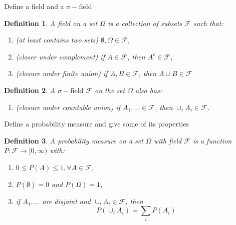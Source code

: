 \documentclass[avery5388,grid,frame]{flashcards}
\newcommand{\sigf}{\sigma-\text{field}}
\newcommand{\F}{\mathcal F}
\newtheorem*{definition}{Definition}
\begin{document}


\begin{flashcard}
    {Define a field and a $\sigf$}
    \begin{definition}
        A field on a set $\Omega$ is a collection of subsets $\F$ such that:
        \begin{enumerate}
            \item (at least contains two sets) $\emptyset, \Omega \in \F$,
            \item (closer under complement) if $A \in \F$, then $A^c \in \F$,
            \item (closure under finite union) if $A, B \in \F$, then $A \cup B \in \F$
        \end{enumerate}
    \end{definition}

    \begin{definition}
        A $\sigf$ $\F$ on the set $\Omega$ also has:
        \begin{enumerate}[resume]
            \item (closure under countable union) if $A_1, \dots \in \F$, then $\cup_i A_i \in \F$.
        \end{enumerate}
    \end{definition}
\end{flashcard}


\begin{flashcard}
    {Define a probability measure and give some of its properties}
    \begin{definition}
        A probability measure on a set $\Omega$ with field $\F$ is a function $P: \F \rightarrow [0, \infty)$ with:
        \begin{enumerate}
            \item $0 \leq P(A) \leq 1, \forall A \in \F$,
            \item $P(\emptyset) = 0$ and $P(\Omega) = 1$,
            \item if $A_1, \dots$ are disjoint and $\cup_i A_i \in \F$, then
            $$P(\cup_i A_i) = \sum_i P(A_i)$$
        \end{enumerate}
    \end{definition}
\end{flashcard}
\end{document}
